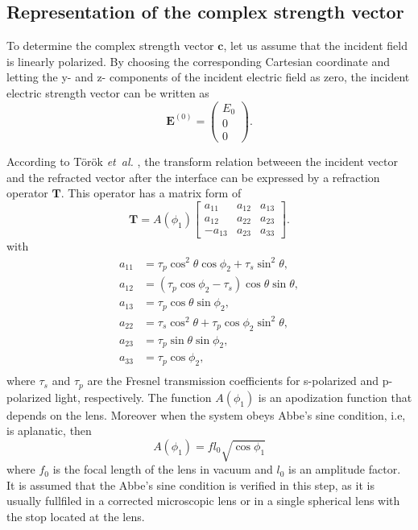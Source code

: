 \documentclass[9pt,twocolumn,twoside]{osajnl}
\begin{document}
\subsection{Representation of the complex strength vector}
To determine the complex strength vector $\mathbf{c}$, let us assume that the incident field is linearly polarized. By choosing the corresponding Cartesian coordinate and letting the y- and z- components of the incident electric field as zero, the incident electric strength vector can be written as
\begin{equation}\label{eq:18}
	\mathbf{E}^{(0)}=
	\begin{pmatrix}
		E_0\\
		0\\
		0
	\end{pmatrix}.
\end{equation}

According to T\"or\"ok \emph{et~al.} \cite{torok1995electromagnetic}, the transform relation betweeen the incident vector and the refracted vector after the interface can be expressed by a refraction operator $\mathbf{T}$. This operator has a matrix form of 
	\begin{equation}\label{eq:19}
		\mathbf{T}=A(\phi_1)
		\begin{bmatrix}
			a_{11} & a_{12} & a_{13}\\
			a_{12} & a_{22} & a_{23}\\
			-a_{13} & a_{23} & a_{33}
		\end{bmatrix}.
	\end{equation}	
with
\begin{equation*}
	\begin{aligned}
		a_{11} &= \tau_p\cos^2\theta\cos\phi_2+\tau_s\sin^2\theta,\\
		a_{12} &= (\tau_p\cos\phi_2-\tau_s)\cos\theta\sin\theta,\\
		a_{13} &= \tau_p\cos\theta\sin\phi_2,\\
		a_{22} &= \tau_s\cos^2\theta+\tau_p\cos\phi_2\sin^2\theta,\\
		a_{23} &= \tau_p\sin\theta\sin\phi_2,\\
		a_{33} &= \tau_p\cos\phi_2,\\	
	\end{aligned}	
\end{equation*}
where $\tau_s$ and $\tau_p$ are the Fresnel transmission coefficients for s-polarized and p-polarized light, respectively. The function $A(\phi_1)$ is an apodization function that depends on the lens. Moreover when the system obeys Abbe's sine condition, i.e, is aplanatic, then
\begin{equation}\label{eq:20}
	A(\phi_1)=f l_0\sqrt{\cos\phi_1}
\end{equation}
where $f_0$ is the focal length of the lens in vacuum and $l_0$ is an amplitude factor. It is assumed that the Abbe's sine condition is verified in this step, as it is usually fullfiled in a corrected microscopic lens or in a single spherical lens with the stop located at the lens.
\end{document}
